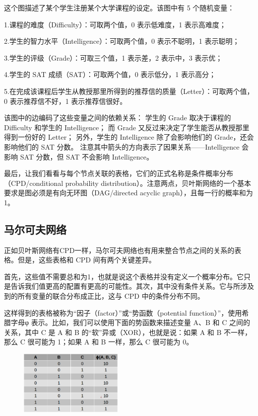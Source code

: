\documentclass{article}
\begin{document}
这个图描述了某个学生注册某个大学课程的设定。该图中有 5 个随机变量：

1.课程的难度（Difficulty）：可取两个值，0 表示低难度，1 表示高难度；

2.学生的智力水平（Intelligence）：可取两个值，0 表示不聪明，1 表示聪明；

3.学生的评级（Grade）：可取三个值，1 表示差，2 表示中，3 表示优；

4.学生的 SAT 成绩（SAT）：可取两个值，0 表示低分，1 表示高分；

5.在完成该课程后学生从教授那里所得到的推荐信的质量（Letter）：可取两个值，0 表示推荐信不好，1 表示推荐信很好。

该图中的边编码了这些变量之间的依赖关系：
学生的 Grade 取决于课程的 Difficulty 和学生的 Intelligence；
而 Grade 又反过来决定了学生能否从教授那里得到一份好的 Letter；
另外，学生的 Intelligence 除了会影响他们的 Grade，还会影响他们的 SAT 分数。
注意其中箭头的方向表示了因果关系——Intelligence 会影响 SAT 分数，但 SAT 不会影响 Intelligence。

最后，让我们看看与每个节点关联的表格，它们的正式名称是条件概率分布（CPD/conditional probability distribution）。注意两点，贝叶斯网络的一个基本要求是图必须是有向无环图（DAG/directed acyclic graph），且每一行的概率和为1。

\subsection{马尔可夫网络}
正如贝叶斯网络有CPD一样，马尔可夫网络也有用来整合节点之间的关系的表格。但是，这些表格和 CPD 间有两个关键差异。

首先，这些值不需要总和为1，也就是说这个表格并没有定义一个概率分布。它只是告诉我们值更高的配置有更高的可能性。其次，其中没有条件关系。它与所涉及到的所有变量的联合分布成正比，这与 CPD 中的条件分布不同。

这样得到的表格被称为“因子（factor）”或“势函数（potential function）”，使用希腊字母φ 表示。比如，我们可以使用下面的势函数来描述变量 A、B 和 C 之间的关系，其中 C 是 A 和 B 的“软”异或（XOR），也就是说：如果 A 和 B 不一样，那么 C 很可能为 1；如果 A 和 B 一样，那么 C 很可能为 0。
\begin{figure}[h]
    \centering
    \includegraphics[width=5cm]{3.png}
\end{figure}
\end{document}
